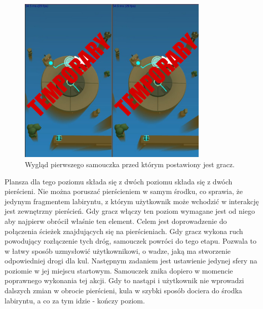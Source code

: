 \documentclass[a4paper,12pt,numbers=noenddot]{report}
\begin{document}
\begin{figure}[h!]
	\centering
  	\includegraphics[height=8cm]{fig/tmp2.jpg}
	\caption{Wygląd pierwszego samouczka przed którym postawiony jest gracz.}
	\label{fig:tut_L1_1}
\end{figure}

Plansza dla tego poziomu składa się z dwóch poziomu składa się z dwóch pierścieni. Nie można poruszać pierścieniem w samym środku, co sprawia, że jedynym fragmentem labiryntu, z którym użytkownik może wchodzić w interakcję jest zewnętrzny pierścień.
Gdy gracz włączy ten poziom wymagane jest od niego aby najpierw obrócił właśnie ten element. Celem jest doprowadzenie do połączenia ścieżek znajdujących się na pierścieniach. Gdy gracz wykona ruch powodujący rozłączenie tych dróg, samouczek powróci do tego etapu. Pozwala to w łatwy sposób uzmysłowić użytkownikowi, o wadze, jaką ma stworzenie odpowiedniej drogi dla kul. 
Następnym zadaniem jest ustawienie jedynej sfery na poziomie w jej miejscu startowym. Samouczek znika dopiero w momencie poprawnego wykonania tej akcji. Gdy to nastąpi i użytkownik nie wprowadzi dalszych zmian w obrocie pierścieni, kula w szybki sposób dociera do środka labiryntu, a co za tym idzie - kończy poziom.
\end{document}
